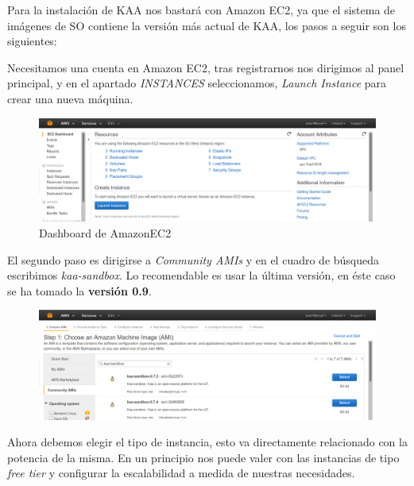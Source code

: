 Para la instalación de KAA nos bastará con Amazon EC2, ya que el sistema de imágenes de SO contiene la versión más actual de KAA, los pasos a seguir son los siguientes:

Necesitamos una cuenta en Amazon EC2, tras registrarnos nos dirigimos al panel principal, y en el apartado \textit{INSTANCES} seleccionamos, \textit{Launch Instance} para crear una nueva máquina.

\begin{figure}[!ht]
  \begin{center}
    \includegraphics[scale=0.30]{../images/kaa/1.png}
		\caption{Dashboard de AmazonEC2}
    \label{fig:1}
	\end{center}
\end{figure}

El segundo paso es dirigirse a \textit{Community AMIs} y en el cuadro de búsqueda escribimos \textit{kaa-sandbox}. Lo recomendable es usar la última versión, en éste caso se ha tomado la \textbf{versión 0.9}.

\begin{figure}[!ht]
  \begin{center}
    \includegraphics[scale=0.30]{../images/kaa/2.png}
		\caption{}
    \label{Instancias preconfiguradas de Kaa en EC2}
	\end{center}
\end{figure}

\newpage

Ahora debemos elegir el tipo de instancia, esto va directamente relacionado con la potencia de la misma. En un principio nos puede valer con las instancias de tipo \textit{free tier} y configurar la escalabilidad a medida de nuestras necesidades.

